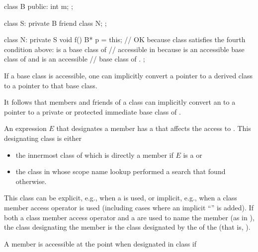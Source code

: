 \begin{example}
\begin{codeblock}
class B {
public:
  int m;
};

class S: private B {
  friend class N;
};

class N: private S {
  void f() {
    B* p = this;    // OK because class  satisfies the fourth condition above:  is a base class of 
                    // accessible in  because  is an accessible base class of  and  is an accessible
                    // base class of .
  }
};
\end{codeblock}
\end{example}

\pnum
If a base class is accessible, one can implicitly convert a pointer to
a derived class to a pointer to that base class.
\begin{note}
It follows that
members and friends of a class
can implicitly convert an
to a pointer to a private or protected immediate base class of
.
\end{note}
An expression $E$ that designates a member 
has a 
that affects the access to .
This designating class is either
\begin{itemize}
\item
the innermost class of which  is directly a member
if $E$ is a  or
\item
the class in whose scope name lookup performed a search
that found  otherwise.
\end{itemize}
\begin{note}
This class can be explicit, e.g., when a
is used, or implicit, e.g., when a class member access operator is used (including cases where an implicit
``''
is
added).
If both a class member access operator and a
are used to name the member (as in
),
the class designating the member is the class designated by the
of the
(that is,
).
\end{note}
A member
is accessible at the point
when designated in class
if
